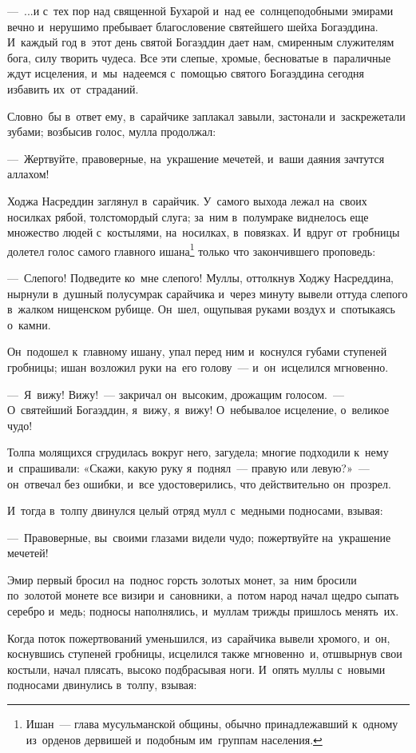 \documentclass[12pt,a4paper]{book}
\begin{document}
—~...и с~тех пор над священной Бухарой и~над ее~солнцеподобными эмирами вечно и~нерушимо пребывает благословение святейшего шейха Богаэддина. И~каждый год в~этот день святой Богаэддин дает нам, смиренным служителям бога, силу творить чудеса. Все эти слепые, хромые, бесноватые в~параличные ждут исцеления, и~мы~надеемся с~помощью святого Богаэддина сегодня избавить их~от~страданий.

Словно~бы в~ответ ему, в~сарайчике заплакал завыли, застонали и~заскрежетали зубами; возбысив голос, мулла продолжал:

—~Жертвуйте, правоверные, на~украшение мечетей, и~ваши даяния зачтутся аллахом!

Ходжа Насреддин заглянул в~сарайчик. У~самого выхода лежал на~своих носилках рябой, толстомордый слуга; за~ним в~полумраке виднелось еще множество людей с~костылями, на~носилках, в~повязках. И~вдруг от~гробницы долетел голос самого главного ишана\footnote{Ишан~— глава мусульманской общины, обычно принадлежавший к~одному из~орденов дервишей и~подобным им~группам населения.} только что закончившего проповедь:

—~Слепого! Подведите ко~мне слепого! Муллы, оттолкнув Ходжу Насреддина, нырнули в~душный полусумрак сарайчика и~через минуту вывели оттуда слепого в~жалком нищенском рубище. Он~шел, ощупывая руками воздух и~спотыкаясь о~камни.

Он~подошел к~главному ишану, упал перед ним и~коснулся губами ступеней гробницы; ишан возложил руки на~его голову~— и~он~исцелился мгновенно.

—~Я~вижу! Вижу!~— закричал он~высоким, дрожащим голосом.~— О~святейший Богаэддин, я~вижу, я~вижу! О~небывалое исцеление, о~великое чудо!

Толпа молящихся сгрудилась вокруг него, загудела; многие подходили к~нему и~спрашивали: «Скажи, какую руку я~поднял~— правую или левую?»~— он~отвечал без ошибки, и~все удостоверились, что действительно он~прозрел.

И~тогда в~толпу двинулся целый отряд мулл с~медными подносами, взывая:

—~Правоверные, вы~своими глазами видели чудо; пожертвуйте на~украшение мечетей!

Эмир первый бросил на~поднос горсть золотых монет, за~ним бросили по~золотой монете все визири и~сановники, а~потом народ начал щедро сыпать серебро и~медь; подносы наполнялись, и~муллам трижды пришлось менять~их.

Когда поток пожертвований уменьшился, из~сарайчика вывели хромого, и~он, коснувшись ступеней гробницы, исцелился также мгновенно~и, отшвырнув свои костыли, начал плясать, высоко подбрасывая ноги. И~опять муллы с~новыми подносами двинулись в~толпу, взывая:
\end{document}
